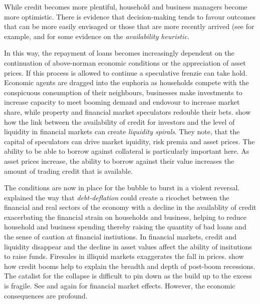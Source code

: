 \documentclass[12pt, a4paper, oneside]{article} %
\begin{document}
While credit becomes more plentiful, household and business managers become more optimistic.  There is evidence that decision-making tends to favour outcomes that can be more easily envisaged or those that are more recently arrived (see for example, \citet{KTAvailability} and \citet{Schwartzavailability} for some evidence on the \emph{availability heuristic}.   %

In this way, the repayment of loans becomes increasingly dependent on the continuation of above-norman economic conditions or the appreciation of asset prices.  If this process is allowed to continue a speculative frenzie can take hold.  Economic agents are dragged into the euphoria as households compete with the conspicuous consumption of their neighbours, businesses make investments to increase capacity to meet booming demand and endovour to increase market share, while property and financial market speculators redouble their bets.  \citet{BrunnermeierLiquidity} show how the link between the availability of credit for investors and the level of liquidity in financial markets can create \emph{liquidity spirals}.   They note,  that the capital of speculators can drive market iquidity, risk premia and asset prices.  The ability to be able to borrow against collateral is particularly important here.  As asset prices increase, the ability to borrow against their value increases the amount of trading credit that is available.  

The conditions are now in place for the bubble to burst in a violent reversal.  \citet{FisherBD, FisherDD} explained the way that \emph{debt-deflation} could create a ricochet between the financial and real sectors of the economy with a decline in the availablity of credit exacerbating the financial strain on households and business, helping to reduce household and business spending thereby raising the quantity of bad loans and the sense of caution at financial instiutions. In financial markets, credit and liquidity disappear and the decline in asset values affect the ability of insitutions to raise funds.  Firesales in illiquid markets exaggerates the fall in prices. \citet{ReinhartRogoff} show how credit booms help to explain the breadth and depth of post-boom recessions.  The catalist for the collapse is difficult to pin down as the build up to the excess is fragile.  See \citet{Gorton2013} and \citet{BrunnermeierLiquidity} again for financial market effects. However, the economic consequences are profound.  
\end{document}
